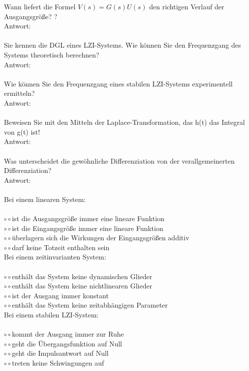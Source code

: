 \documentclass[A4]{scrartcl}
\begin{document}
  Wann liefert die Formel $V(s) = G(s)U(s)$ den richtigen Verlauf der Ausgangsgröße? ?\\
  Antwort:\\\\
  Sie kennen die DGL eines LZI-Systems. Wie können Sie den Frequenzgang des Systems theoretisch berechnen?\\
  Antwort:\\\\
  Wie können Sie den Frequenzgang eines stabilen LZI-Systems experimentell ermitteln?\\
  Antwort:\\\\
  Beweisen Sie mit den Mitteln der Laplace-Transformation, das h(t) das Integral von g(t) ist!\\
  Antwort:\\\\
  Was unterscheidet die gewöhnliche Differenziation von der verallgemeinerten Differenziation?\\
  Antwort:\\\\ 
  
  Bei einem linearen System:\\\\
  $\circ\circ$ist die Ausgangsgröße immer eine lineare Funktion\\
  $\circ\circ$ist die Eingangsgröße immer eine lineare Funktion\\
  $\circ\circ$überlagern sich die Wirkungen der Eingangsgrößen additiv\\
  $\circ\circ$darf keine Totzeit enthalten sein\\

  Bei einem zeitinvarianten System:\\\\
  $\circ\circ$enthält das System keine dynamischen Glieder\\
  $\circ\circ$enthält das System keine nichtlinearen Glieder\\
  $\circ\circ$ist der Ausgang immer konstant\\
  $\circ\circ$enthält das System keine zeitabhängigen Parameter\\

  Bei einem stabilen LZI-System:\\\\
  $\circ\circ$kommt der Ausgang immer zur Ruhe \\
  $\circ\circ$geht die Übergangsfunktion auf Null\\
  $\circ\circ$geht die Impulsantwort auf Null\\
  $\circ\circ$treten keine Schwingungen auf\\
\end{document}
